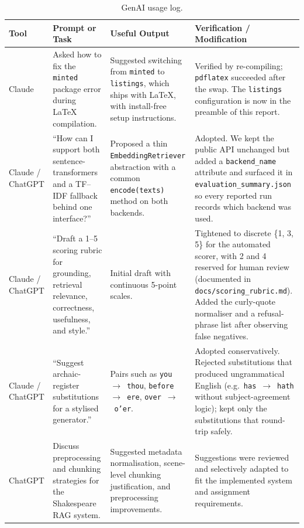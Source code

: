 \documentclass[10pt,conference]{IEEEtran}
\begin{document}
\begin{table}[!htbp]
\centering
\caption{GenAI usage log.}
\label{tab:genai-log}
\scriptsize
\setlength{\tabcolsep}{4pt}
\renewcommand{\arraystretch}{1.05}
\begin{tabularx}{\textwidth}{p{1.6cm} p{2.6cm} p{3.0cm} X}
\toprule
Tool & Prompt or Task & Useful Output & Verification / Modification \\
\midrule
Claude
& Asked how to fix the \texttt{minted} package error during LaTeX compilation.
& Suggested switching from \texttt{minted} to \texttt{listings}, which ships with LaTeX, with install-free setup instructions.
& Verified by re-compiling; \texttt{pdflatex} succeeded after the swap. The \texttt{listings} configuration is now in the preamble of this report. \\
\midrule
Claude / ChatGPT
& ``How can I support both sentence-transformers and a TF--IDF fallback behind one interface?''
& Proposed a thin \texttt{EmbeddingRetriever} abstraction with a common \texttt{encode(texts)} method on both backends.
& Adopted. We kept the public API unchanged but added a \texttt{backend\_name} attribute and surfaced it in \verb|evaluation_summary.json| so every reported run records which backend was used. \\
\midrule
Claude / ChatGPT
& ``Draft a 1--5 scoring rubric for grounding, retrieval relevance, correctness, usefulness, and style.''
& Initial draft with continuous 5-point scales.
& Tightened to discrete \{1, 3, 5\} for the automated scorer, with 2 and 4 reserved for human review (documented in \verb|docs/scoring_rubric.md|). Added the curly-quote normaliser and a refusal-phrase list after observing false negatives. \\
\midrule
Claude / ChatGPT
& ``Suggest archaic-register substitutions for a stylised generator.''
& Pairs such as \texttt{you}~$\to$~\texttt{thou}, \texttt{before}~$\to$~\texttt{ere}, \texttt{over}~$\to$~\texttt{o'er}.
& Adopted conservatively. Rejected substitutions that produced ungrammatical English (e.g.\ \texttt{has}~$\to$~\texttt{hath} without subject-agreement logic); kept only the substitutions that round-trip safely. \\
\midrule
ChatGPT
& Discuss preprocessing and chunking strategies for the Shakespeare RAG system.
& Suggested metadata normalisation, scene-level chunking justification, and preprocessing improvements.
& Suggestions were reviewed and selectively adapted to fit the implemented system and assignment requirements. \\
\midrule

\end{tabularx}
\end{table}
\end{document}
